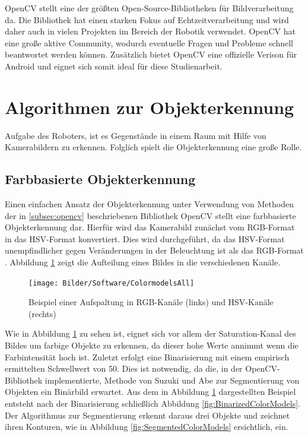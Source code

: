 OpenCV \cite{opencv_library, bradski2008learning} stellt eine der größten Open-Source-Bibliotheken für Bildverarbeitung da. Die Bibliothek hat einen starken Fokus auf Echtzeitverarbeitung und wird daher auch in vielen Projekten im Bereich der Robotik verwendet. OpenCV hat eine große aktive Community, wodurch eventuelle Fragen und Probleme schnell beantwortet werden können. Zusätzlich bietet OpenCV eine offizielle Verison für Android und eignet sich somit ideal für diese Studienarbeit.


\section{Algorithmen zur Objekterkennung}
\label{sec:Objekterkennung}

Aufgabe des Roboters, ist es Gegenstände in einem Raum mit Hilfe von Kamerabildern zu erkennen. Folglich spielt die Objekterkennung eine große Rolle.

\subsection{Farbbasierte Objekterkennung}
Einen einfachen Ansatz der Objekterkennung unter Verwendung von Methoden der in \ref{subsec:opencv} beschriebenen Bibliothek OpenCV stellt eine farbbasierte Objekterkennung dar. Hierfür wird das Kamerabild zunächst vom RGB-Format in das HSV-Format konvertiert. Dies wird durchgeführt, da das HSV-Format unempfindlicher gegen Veränderungen in der Beleuchtung ist als das RGB-Format \cite{cucchiara2001improving}. Abbildung \ref{fig:ColorModels} zeigt die Aufteilung eines Bildes in die verschiedenen Kanäle.

\begin{figure}[h]
\centering
\texttt{[image: Bilder/Software/ColormodelsAll]}
\caption{Beispiel einer Aufspaltung in RGB-Kanäle (links) und HSV-Kanäle (rechts)}
\label{fig:ColorModels}
\end{figure}

Wie in Abbildung \ref{fig:ColorModels} zu sehen ist, eignet sich vor allem der Saturation-Kanal des Bildes um farbige Objekte zu erkennen, da dieser hohe Werte annimmt wenn die Farbintensität hoch ist. Zuletzt erfolgt eine Binarisierung mit einem empirisch ermittelten Schwellwert von 50. Dies ist notwendig, da die, in der OpenCV-Bibliothek implementierte, Methode von Suzuki und Abe \cite{suzuki1985topological} zur Segmentierung von Objekten ein Binärbild erwartet. Aus dem in Abbildung \ref{fig:ColorModels} dargestellten Beispiel entsteht nach der Binarisierung schließlich Abbildung \ref{fig:BinarizedColorModels}. Der Algorithmus zur Segmentierung erkennt daraus drei Objekte und zeichnet ihren Konturen, wie in Abbildung \ref{fig:SegmentedColorModels} ersichtlich, ein.

